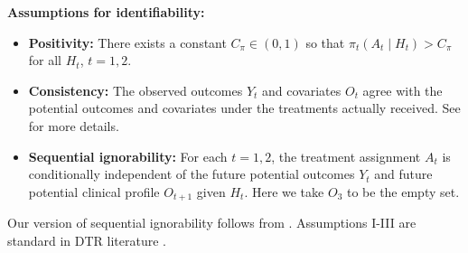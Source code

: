 \documentclass[preprint] {imsart}
\begin{document}
\noindent \textbf{Assumptions for identifiability:}
\begin{itemize}
    \item[I.] \textbf{Positivity:} There exists a constant $C_{\pi}\in(0,1)$ so that $\pi_t(A_t \mid H_t)>C_\pi$ for all $H_t$, $t=1,2$.
    \item[II.]\textbf{Consistency:} The observed outcomes $Y_t$ and covariates $O_t$ agree with the potential outcomes and covariates  under the treatments actually received. See \cite{schulte2014, robins1994correcting} for more details.
    \item[III]\textbf{Sequential ignorability:} For each $t=1,2$, the treatment assignment $A_t$ is conditionally independent of the future potential outcomes $Y_{t}$ and future potential clinical profile $O_{t+1}$ given $H_t$. Here we take $O_3$ to be the empty set.
\end{itemize}
Our version of sequential ignorability follows from  \cite{robins1997causal, MurphySA2001MMMf}. Assumptions I-III are standard in DTR literature  \citep[e.g.]{schulte2014,sonabendw2021semisupervised, MurphySA2001MMMf, zhao2015}.  
\end{document}
